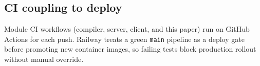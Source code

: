 \subsection{CI coupling to deploy}\label{subsec:ci-deploy-gate}

Module CI workflows (compiler, server, client, and this paper) run on GitHub Actions for each push. Railway treats a
green \texttt{main} pipeline as a deploy gate before promoting new container images, so failing tests block production
rollout without manual override.
